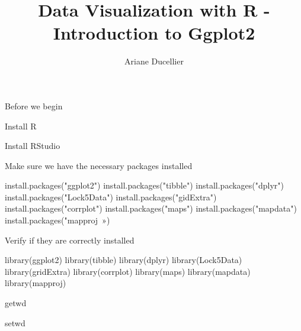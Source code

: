 \documentclass{beamer}
\title[Introduction to Ggplot2]{Data Visualization with R - Introduction to Ggplot2}
\author{Ariane Ducellier}
\begin{document}
	\begin{frame}
		\titlepage
	\end{frame}

	\begin{frame}


Before we begin

Install R

Install RStudio

Make sure we have the necessary packages installed

install.packages("ggplot2")
install.packages("tibble")
install.packages("dplyr")
install.packages("Lock5Data")
install.packages("gidExtra")
install.packages("corrplot")
install.packages("maps")
install.packages("mapdata")
install.packages("mapproj »)

Verify if they are correctly installed

library(ggplot2)
library(tibble)
library(dplyr)
library(Lock5Data)
library(gridExtra)
library(corrplot)
library(maps)
library(mapdata)
library(mapproj)


getwd

setwd

	\end{frame}
\end{document}
